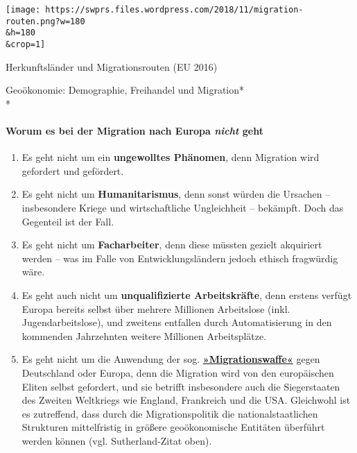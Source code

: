 \href{https://swprs.files.wordpress.com/2018/11/migration-routen.png}{}

\texttt{[image: https://swprs.files.wordpress.com/2018/11/migration-routen.png?w=180\\\&h=180\\\&crop=1]}

Herkunftsländer und Migrationsrouten (EU 2016)

Geoökonomie: Demographie, Freihandel und Migration*\\
*

\hypertarget{worum-es-bei-der-migration-nach-europa-nicht-geht}{%
\paragraph{\texorpdfstring{Worum es bei der Migration nach Europa
\emph{nicht}
geht}{Worum es bei der Migration nach Europa nicht geht}}\label{worum-es-bei-der-migration-nach-europa-nicht-geht}}

\begin{enumerate}
\def\labelenumi{\arabic{enumi}.}
\tightlist
\item
  Es geht nicht um ein \textbf{ungewolltes Phänomen}, denn Migration
  wird gefordert und gefördert.
\item
  Es geht nicht um \textbf{Humanitarismus}, denn sonst würden die
  Ursachen -- insbesondere Kriege und wirtschaftliche Ungleichheit --
  bekämpft. Doch das Gegenteil ist der Fall.
\item
  Es geht nicht um \textbf{Facharbeiter}, denn diese müssten gezielt
  akquiriert werden -- was im Falle von Entwicklungsländern jedoch
  ethisch fragwürdig wäre.
\item
  Es geht auch nicht um \textbf{unqualifizierte Arbeitskräfte}, denn
  erstens verfügt Europa bereits selbst über mehrere Millionen
  Arbeitslose (inkl. Jugendarbeitslose), und zweitens entfallen durch
  Automatisierung in den kommenden Jahrzehnten weitere Millionen
  Arbeitsplätze.
\item
  Es geht nicht um die Anwendung der sog.
  \textbf{\href{https://de.wikipedia.org/wiki/Weapons_of_Mass_Migration}{»Migrationswaffe«}}
  gegen Deutschland oder Europa, denn die Migration wird von den
  europäischen Eliten selbst gefordert, und sie betrifft insbesondere
  auch die Siegerstaaten des Zweiten Weltkriegs wie England, Frankreich
  und die USA. Gleichwohl ist es zutreffend, dass durch die
  Migrationspolitik die national­staatlichen Strukturen mittelfristig in
  größere geoökonomische Entitäten überführt werden können (vgl.
  Sutherland-Zitat oben).
\end{enumerate}

